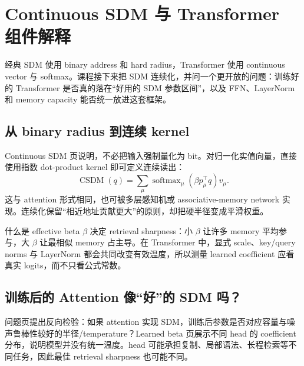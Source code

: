 \section{Continuous SDM 与 Transformer 组件解释}

经典 SDM 使用 binary address 和 hard radius，Transformer 使用 continuous vector 与 softmax。课程接下来把 SDM 连续化，并问一个更开放的问题：训练好的 Transformer 是否真的落在“好用的 SDM 参数区间”，以及 FFN、LayerNorm 和 memory capacity 能否统一放进这套框架。

\subsection{从 binary radius 到连续 kernel}

Continuous SDM 页说明，不必把输入强制量化为 bit。对归一化实值向量，直接使用指数 dot-product kernel 即可定义连续读出：
$$
\operatorname{CSDM}(q)=
\sum_\mu\operatorname{softmax}_\mu(\beta p_\mu^{\top}q)v_\mu.
$$
这与 attention 形式相同，也可被多层感知机或 associative-memory network 实现。连续化保留“相近地址贡献更大”的原则，却把硬半径变成平滑权重。


\begin{knowledgebox}{什么是 effective beta}
$\beta$ 决定 retrieval sharpness：小 $\beta$ 让许多 memory 平均参与，大 $\beta$ 让最相似 memory 占主导。在 Transformer 中，显式 scale、key/query norms 与 LayerNorm 都会共同改变有效温度，所以测量 learned coefficient 应看真实 logits，而不只看公式常数。
\end{knowledgebox}

\subsection{训练后的 Attention 像“好”的 SDM 吗？}

问题页提出反向检验：如果 attention 实现 SDM，训练后参数是否对应容量与噪声鲁棒性较好的半径/temperature？Learned beta 页展示不同 head 的 coefficient 分布，说明模型并没有统一温度。head 可能承担复制、局部语法、长程检索等不同任务，因此最佳 retrieval sharpness 也可能不同。



